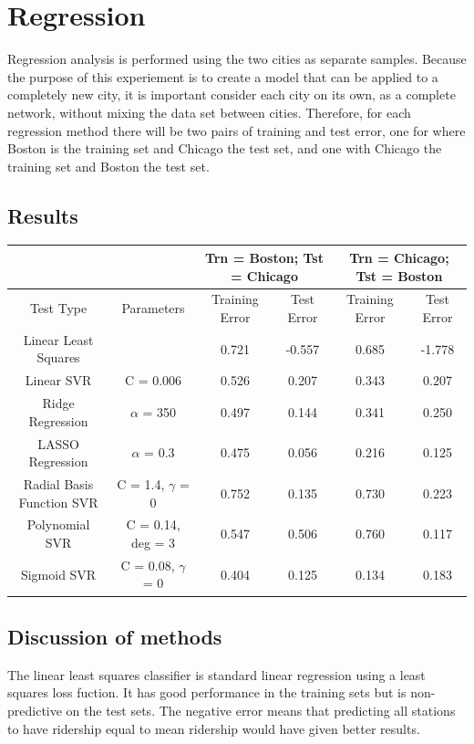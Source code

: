 \documentclass{article}
\begin{document}
\section{Regression}

Regression analysis is performed using the two cities as separate samples. Because the purpose of this experiement is to create a model that can be applied to a completely new city, it is important consider each city on its own, as a complete network, without mixing the data set between cities. Therefore, for each regression method there will be two pairs of training and test error, one for where Boston is the training set and Chicago the test set, and one with Chicago the training set and Boston the test set. 

\subsection{Results}

\begin{center}\begin{tabular}{ c c c c c c}
\cline{3-6}
&&\multicolumn{2}{c}{Trn = Boston; Tst = Chicago}&\multicolumn{2}{c}{Trn = Chicago; Tst = Boston} \\ \hline
Test Type & Parameters & Training Error & Test Error &Training Error & Test Error \\
\hline\hline
Linear Least Squares & &0.721 & -0.557 & 0.685 & -1.778 \\
Linear SVR & C = 0.006& 0.526 & 0.207 & 0.343 & 0.207 \\
Ridge Regression & $\alpha$ = 350 &0.497 & 0.144 & 0.341 & 0.250 \\
LASSO Regression & $\alpha$ = 0.3&0.475 & 0.056 & 0.216 & 0.125 \\
Radial Basis Function SVR & C = 1.4, $\gamma$ = 0 &0.752& 0.135 & 0.730 & 0.223 \\
Polynomial SVR & C = 0.14, deg = 3& 0.547 & 0.506 & 0.760 & 0.117 \\
Sigmoid SVR & C = 0.08, $\gamma$ = 0& 0.404 & 0.125 & 0.134 & 0.183 \\
\end{tabular}\end{center}

\subsection{Discussion of methods}

The linear least squares classifier is standard linear regression using a least squares loss fuction. It has good performance in the training sets but is non-predictive on the test sets. The negative error means that predicting all stations to have ridership equal to mean ridership would have given better results.
\end{document}
